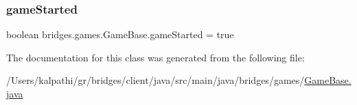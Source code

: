 \subsubsection{\texorpdfstring{game\+Started}{gameStarted}}
{\footnotesize\ttfamily boolean bridges.\+games.\+Game\+Base.\+game\+Started = true\hspace{0.3cm}{\ttfamily [protected]}}



The documentation for this class was generated from the following file\+:\begin{DoxyCompactItemize}
\item 
/\+Users/kalpathi/gr/bridges/client/java/src/main/java/bridges/games/\mbox{\hyperlink{_game_base_8java}{Game\+Base.\+java}}\end{DoxyCompactItemize}
